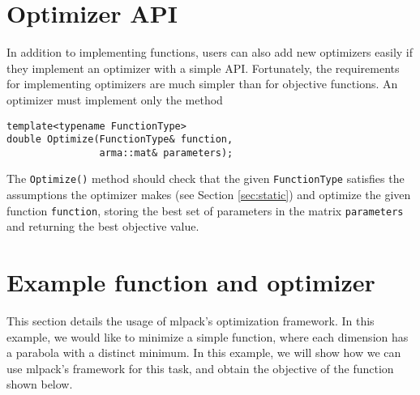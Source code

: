 \documentclass{article}
\begin{document}
\vspace*{-0.3em}
\section{Optimizer API}
\vspace*{-0.4em}

In addition to implementing functions, users can also add new optimizers easily
if they implement an optimizer with a simple API.  Fortunately, the requirements
for implementing optimizers are much simpler than for objective functions.  An
optimizer must implement only the method

\vspace*{-0.5em}
\begin{verbatim}
template<typename FunctionType>
double Optimize(FunctionType& function,
                arma::mat& parameters);
\end{verbatim}
\vspace*{-0.5em}

The {\tt Optimize()} method should check that the given {\tt FunctionType}
satisfies the assumptions the optimizer makes (see Section \ref{sec:static}) and
optimize the given function {\tt function}, storing the best set of parameters
in the matrix {\tt parameters} and returning the best objective value.

\vspace*{-0.3em}
\section{Example function and optimizer}
\vspace*{-0.4em}

This section details the usage of mlpack's optimization framework. In this
example, we would like to minimize a simple function, where each dimension has a
parabola with a distinct minimum. In this example, we will show how we can use
mlpack’s framework for this task, and obtain the objective of the function shown
below.
\end{document}
